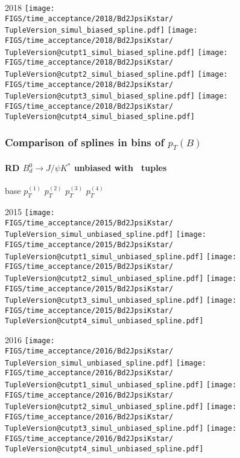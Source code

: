 \begin{frame}
  2018
  \texttt{[image: \\FIGS/time\_acceptance/2018/Bd2JpsiKstar/\\TupleVersion\_simul\_biased\_spline.pdf]}
  \texttt{[image: \\FIGS/time\_acceptance/2018/Bd2JpsiKstar/\\TupleVersion@cutpt1\_simul\_biased\_spline.pdf]}
  \texttt{[image: \\FIGS/time\_acceptance/2018/Bd2JpsiKstar/\\TupleVersion@cutpt2\_simul\_biased\_spline.pdf]}
  \texttt{[image: \\FIGS/time\_acceptance/2018/Bd2JpsiKstar/\\TupleVersion@cutpt3\_simul\_biased\_spline.pdf]}
  \texttt{[image: \\FIGS/time\_acceptance/2018/Bd2JpsiKstar/\\TupleVersion@cutpt4\_simul\_biased\_spline.pdf]}

\end{frame} %



\begin{frame} %
\frametitle{Comparison of splines in bins of $p_T(B)$}
\framesubtitle{RD $B_d^0\rightarrow J/\psi K^*$ unbiased with \TupleVersion\, tuples}

  \phantom{2020} base \hspace*{1.5cm} $p_T^{(1)}$ \hspace*{1.5cm} $p_T^{(2)}$ \hspace*{1.5cm} $p_T^{(3)}$ \hspace*{1.5cm} $p_T^{(4)}$

  2015
  \texttt{[image: \\FIGS/time\_acceptance/2015/Bd2JpsiKstar/\\TupleVersion\_simul\_unbiased\_spline.pdf]}
  \texttt{[image: \\FIGS/time\_acceptance/2015/Bd2JpsiKstar/\\TupleVersion@cutpt1\_simul\_unbiased\_spline.pdf]}
  \texttt{[image: \\FIGS/time\_acceptance/2015/Bd2JpsiKstar/\\TupleVersion@cutpt2\_simul\_unbiased\_spline.pdf]}
  \texttt{[image: \\FIGS/time\_acceptance/2015/Bd2JpsiKstar/\\TupleVersion@cutpt3\_simul\_unbiased\_spline.pdf]}
  \texttt{[image: \\FIGS/time\_acceptance/2015/Bd2JpsiKstar/\\TupleVersion@cutpt4\_simul\_unbiased\_spline.pdf]}
  \vspace*{2mm}

  2016
  \texttt{[image: \\FIGS/time\_acceptance/2016/Bd2JpsiKstar/\\TupleVersion\_simul\_unbiased\_spline.pdf]}
  \texttt{[image: \\FIGS/time\_acceptance/2016/Bd2JpsiKstar/\\TupleVersion@cutpt1\_simul\_unbiased\_spline.pdf]}
  \texttt{[image: \\FIGS/time\_acceptance/2016/Bd2JpsiKstar/\\TupleVersion@cutpt2\_simul\_unbiased\_spline.pdf]}
  \texttt{[image: \\FIGS/time\_acceptance/2016/Bd2JpsiKstar/\\TupleVersion@cutpt3\_simul\_unbiased\_spline.pdf]}
  \texttt{[image: \\FIGS/time\_acceptance/2016/Bd2JpsiKstar/\\TupleVersion@cutpt4\_simul\_unbiased\_spline.pdf]}
  \vspace*{2mm}


\end{frame}
